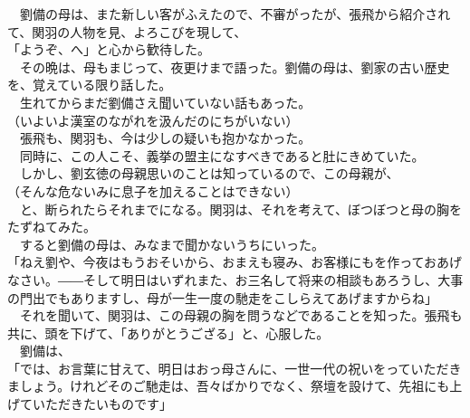 \documentclass[
  paper=a5,
  fontsize=10pt,
  jafontsize=9.5pt,
  tate,                  %
  open_bracket_pos=nibu, %
]{jlreq}
\begin{document}
　劉備の母は、また新しい客がふえたので、不審がったが、張飛から紹介されて、関羽の人物を見、よろこびを現して、\\


「ようぞ、へ」と心から歓待した。\\


　その晩は、母もまじって、夜更けまで語った。劉備の母は、劉家の古い歴史を、覚えている限り話した。\\


　生れてからまだ劉備さえ聞いていない話もあった。\\


（いよいよ漢室のながれを汲んだのにちがいない）\\


　張飛も、関羽も、今は少しの疑いも抱かなかった。\\


　同時に、この人こそ、義挙の盟主になすべきであると肚にきめていた。\\


　しかし、劉玄徳の母親思いのことは知っているので、この母親が、\\


（そんな危ないみに息子を加えることはできない）\\


　と、断られたらそれまでになる。関羽は、それを考えて、ぼつぼつと母の胸をたずねてみた。\\


　すると劉備の母は、みなまで聞かないうちにいった。\\


「ねえ劉や、今夜はもうおそいから、おまえも寝み、お客様にもを作っておあげなさい。――そして明日はいずれまた、お三名して将来の相談もあろうし、大事の門出でもありますし、母が一生一度の馳走をこしらえてあげますからね」\\


　それを聞いて、関羽は、この母親の胸を問うなどであることを知った。張飛も共に、頭を下げて、「ありがとうござる」と、心服した。\\


　劉備は、\\


「では、お言葉に甘えて、明日はおっ母さんに、一世一代の祝いをっていただきましょう。けれどそのご馳走は、吾々ばかりでなく、祭壇を設けて、先祖にも上げていただきたいものです」\\
\end{document}

